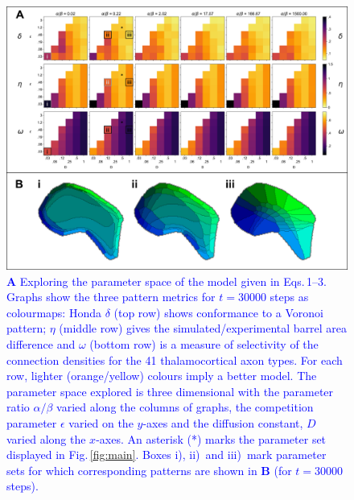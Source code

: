 \documentclass[9pt,lineno,draft]{elife}
\newcommand{\cmnt}[1]{\textcolor{blue}{#1}}
\begin{document}
\begin{figure}
  \begin{fullwidth}
    \includegraphics[width=\linewidth]{./Fig2.png}
    \caption{\cmnt{\textbf{A} Exploring the parameter space of the model given
        in Eqs.\,1--3. Graphs show the three pattern metrics for $t=30000$
        steps as colourmaps: Honda $\delta$ (top row) shows conformance to a
        Voronoi pattern; $\eta$ (middle row) gives the simulated/experimental
        barrel area difference and $\omega$ (bottom row) is a measure of
        selectivity of the connection densities for the 41
        thalamocortical axon types. For each row, lighter (orange/yellow)
        colours imply a better model. The parameter space explored is three
        dimensional with the parameter ratio $\alpha/\beta$ varied along the
        columns of graphs, the competition parameter $\epsilon$ varied on the
        $y$-axes and the diffusion constant, $D$ varied along the $x$-axes. An
        asterisk (*) marks the parameter set displayed in
        Fig.\,\ref{fig:main}. Boxes i), ii)~and iii)~mark parameter sets for which
        corresponding patterns are shown in \textbf{B} (for $t=30000$ steps).}}
    \label{fig:paramsweep}
  \end{fullwidth}
\end{figure}
\end{document}
